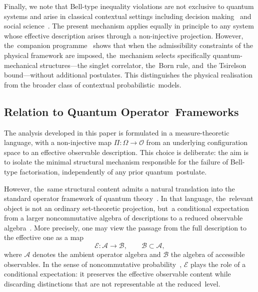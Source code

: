 \documentclass[11pt,a4paper]{article}
\theoremstyle{remark}
\begin{document}
    Finally, we note that Bell-type inequality violations are not exclusive to quantum
    systems and arise in classical contextual settings including decision
    making~\cite{Sulis2025} and social science~\cite{Haven2014}.
    The present mechanism applies equally in principle to any system whose effective
    description arises through a non-injective projection.
    However, the~companion programme~\cite{Q1} shows that when the admissibility
    constraints of the physical framework are imposed, the~mechanism selects specifically
    quantum-mechanical structures---the singlet correlator, the~Born rule, and~the
    Tsirelson bound---without additional postulates.
    This distinguishes the physical realisation from the broader class of contextual
    probabilistic~models.

  \subsection{Relation to Quantum Operator~Frameworks}
    \label{subsec:operator}

    The analysis developed in this paper is formulated in a measure-theoretic language,
    with a non-injective map $\Pi : \Omega \to \mathcal{O}$ from an underlying configuration
    space to an effective observable description.
    This choice is deliberate: the aim is to isolate the minimal structural mechanism
    responsible for the failure of Bell-type factorisation, independently of any prior
    quantum~postulate.

    However, the~same structural content admits a natural translation into the standard
    operator framework of quantum theory~\cite{NielsenChuang2000}.
    In that language, the~relevant object is not an ordinary set-theoretic projection, but~a
    conditional expectation from a larger noncommutative algebra of descriptions to a
    reduced observable algebra~\cite{AccardiCecchini1982}.
    More precisely, one may view the passage from the full description to the effective one
    as a map
\begin{equation}
      \mathcal{E} : \mathcal{A} \to \mathcal{B},
      \qquad \mathcal{B} \subset \mathcal{A},
    \end{equation}
    where $\mathcal{A}$ denotes the ambient operator algebra and $\mathcal{B}$ the algebra
    of accessible observables.
    In the sense of noncommutative probability~\cite{AccardiCecchini1982}, $\mathcal{E}$
    plays the role of a conditional expectation: it preserves the effective observable content
    while discarding distinctions that are not representable at the reduced~level.
\end{document}
